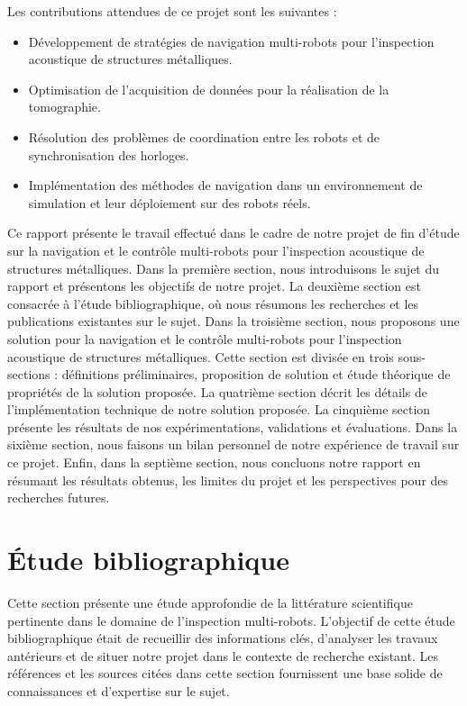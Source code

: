 \documentclass[francais,RandD]{rapportPFE}
\begin{document}
		Les contributions attendues de ce projet sont les suivantes :
		\begin{itemize}
			\item Développement de stratégies de navigation multi-robots pour l'inspection acoustique de structures métalliques.
			\item Optimisation de l'acquisition de données pour la réalisation de la tomographie.
			\item Résolution des problèmes de coordination entre les robots et de synchronisation des horloges.
			\item Implémentation des méthodes de navigation dans un environnement de simulation et leur déploiement sur des robots réels.
		\end{itemize}

		Ce rapport présente le travail effectué dans le cadre de notre projet de fin d'étude sur la navigation et le contrôle multi-robots pour l'inspection acoustique de structures métalliques. Dans la première section, nous introduisons le sujet du rapport et présentons les objectifs de notre projet. La deuxième section est consacrée à l'étude bibliographique, où nous résumons les recherches et les publications existantes sur le sujet. Dans la troisième section, nous proposons une solution pour la navigation et le contrôle multi-robots pour l'inspection acoustique de structures métalliques. Cette section est divisée en trois sous-sections : définitions préliminaires, proposition de solution et étude théorique de propriétés de la solution proposée. La quatrième section décrit les détails de l'implémentation technique de notre solution proposée. La cinquième section présente les résultats de nos expérimentations, validations et évaluations. Dans la sixième section, nous faisons un bilan personnel de notre expérience de travail sur ce projet. Enfin, dans la septième section, nous concluons notre rapport en résumant les résultats obtenus, les limites du projet et les perspectives pour des recherches futures.
	\section{Étude bibliographique}
		Cette section présente une étude approfondie de la littérature scientifique pertinente dans le domaine de l'inspection multi-robots.
		L'objectif de cette étude bibliographique était de recueillir des informations clés, d'analyser les travaux antérieurs et de situer notre projet dans le contexte de recherche existant.
		Les références et les sources citées dans cette section fournissent une base solide de connaissances et d'expertise sur le sujet.
\end{document}
